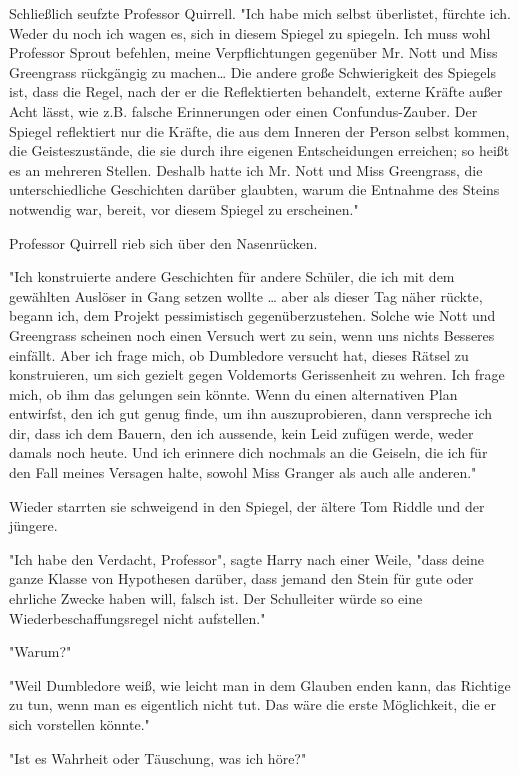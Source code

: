 {Schließlich seufzte Professor Quirrell. "Ich habe mich selbst überlistet, fürchte ich. Weder du noch ich wagen es, sich in diesem Spiegel zu spiegeln. Ich muss wohl Professor Sprout befehlen, meine Verpflichtungen gegenüber Mr. Nott und Miss Greengrass rückgängig zu machen… Die andere große Schwierigkeit des Spiegels ist, dass die Regel, nach der er die Reflektierten behandelt, externe Kräfte außer Acht lässt, wie z.B. falsche Erinnerungen oder einen Confundus-Zauber. Der Spiegel reflektiert nur die Kräfte, die aus dem Inneren der Person selbst kommen, die Geisteszustände, die sie durch ihre eigenen Entscheidungen erreichen; so heißt es an mehreren Stellen. Deshalb hatte ich Mr. Nott und Miss Greengrass, die unterschiedliche Geschichten darüber glaubten, warum die Entnahme des Steins notwendig war, bereit, vor diesem Spiegel zu erscheinen."

Professor Quirrell rieb sich über den Nasenrücken.

"Ich konstruierte andere Geschichten für andere Schüler, die ich mit dem gewählten Auslöser in Gang setzen wollte … aber als dieser Tag näher rückte, begann ich, dem Projekt pessimistisch gegenüberzustehen. Solche wie Nott und Greengrass scheinen noch einen Versuch wert zu sein, wenn uns nichts Besseres einfällt. Aber ich frage mich, ob Dumbledore versucht hat, dieses Rätsel zu konstruieren, um sich gezielt gegen Voldemorts Gerissenheit zu wehren. Ich frage mich, ob ihm das gelungen sein könnte. Wenn du einen alternativen Plan entwirfst, den ich gut genug finde, um ihn auszuprobieren, dann verspreche ich dir, dass ich dem Bauern, den ich aussende, kein Leid zufügen werde, weder damals noch heute. Und ich erinnere dich nochmals an die Geiseln, die ich für den Fall meines Versagen halte, sowohl Miss Granger als auch alle anderen."

Wieder starrten sie schweigend in den Spiegel, der ältere Tom Riddle und der jüngere.

"Ich habe den Verdacht, Professor", sagte Harry nach einer Weile, "dass deine ganze Klasse von Hypothesen darüber, dass jemand den Stein für gute oder ehrliche Zwecke haben will, falsch ist. Der Schulleiter würde so eine Wiederbeschaffungsregel nicht aufstellen."

"Warum?"

"Weil Dumbledore weiß, wie leicht man in dem Glauben enden kann, das Richtige zu tun, wenn man es eigentlich nicht tut. Das wäre die erste Möglichkeit, die er sich vorstellen könnte."

"Ist es Wahrheit oder Täuschung, was ich höre?"

}
